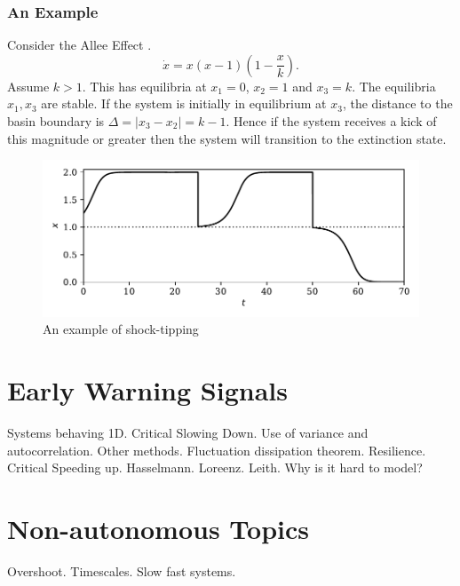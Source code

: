 \subsubsection{An Example}
Consider the Allee Effect \parencite{Allee1932,Stephens1999}.
\begin{equation}
  \label{eq:allee_effect}
  \dot{x} = x\left(x-1\right)\left(1-\frac{x}{k}\right).
\end{equation}
Assume $k > 1$. This has equilibria at $x_1 = 0$, $x_2 = 1$ and $x_3 = k$. The equilibria $x_1,x_3$ are stable. If the system is
initially in equilibrium at $x_3$, the distance to the basin boundary is $\Delta = |x_3 - x_2| = k - 1$. Hence if the system receives a kick of
this magnitude or greater then the system will transition to the extinction state.

\begin{figure}
  \centering
  \includegraphics{shock}
  \caption{An example of shock-tipping}
  \label{fig:shock_tipping}
\end{figure}


\section{Early Warning Signals}
Systems behaving 1D. Critical Slowing Down. Use of variance and
autocorrelation. Other methods. Fluctuation dissipation theorem.
Resilience. Critical Speeding up. Hasselmann. Loreenz. Leith. 
Why is it hard to model?
\section{Non-autonomous Topics}
Overshoot. Timescales. Slow fast systems.